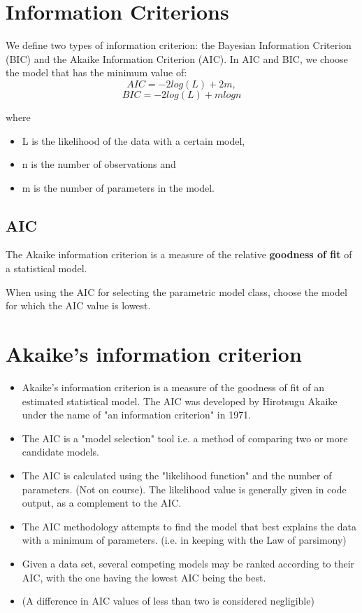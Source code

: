 \documentclass[a4paper,12pt]{article}
\begin{document}
\section{Information Criterions}


We define two types of information criterion: the Bayesian Information
Criterion (BIC) and the Akaike Information Criterion (AIC). In AIC and BIC, we choose the model that
has the minimum value of:
\[AIC = −2log(L)+2m,\]
\[BIC = −2log(L)+mlogn\]

where
\begin{itemize}
\item L is the likelihood of the data with a certain model,
\item n is the number of observations and
\item m is the number of parameters in the model.
\end{itemize}
\subsection{AIC}
The Akaike information criterion is a measure of the relative \textbf{goodness of fit} of a statistical model.

When using the AIC for selecting the parametric model class, choose
the model for which the AIC value is lowest.
\newpage
\section{Akaike's information criterion}
\begin{itemize}
    \item Akaike's information criterion is a measure of the goodness of fit of an estimated statistical model. The AIC was developed by Hirotsugu Akaike under the name of "an information criterion" in 1971.

\item The AIC is a "model selection" tool i.e. a method of comparing two or more candidate models.

\item The AIC is calculated using the "likelihood function" and the number of parameters. (Not on course). The likelihood value is generally given in code output, as a complement to the AIC.

\item 
The AIC methodology attempts to find the model that best explains the data with a minimum of parameters. (i.e. in keeping with the Law of parsimony)

\item 
Given a data set, several competing models may be ranked according to their AIC, with the one having the lowest AIC being the best.

\item 
(A difference in AIC values of less than two is considered negligible)
\end{itemize}
\end{document}
